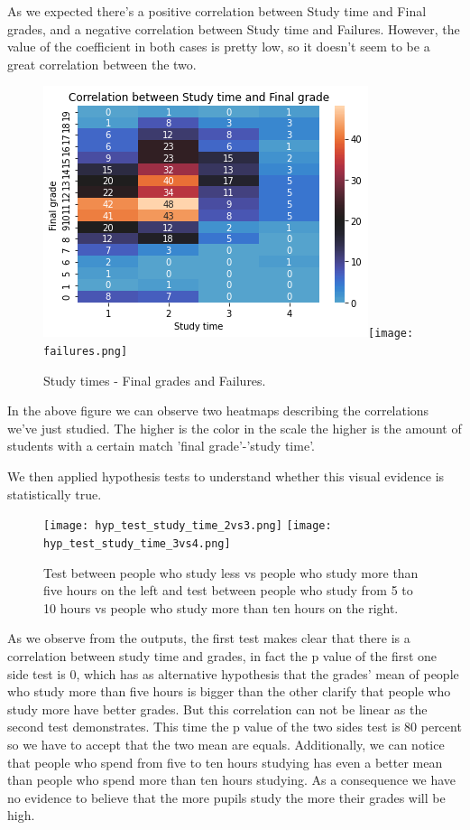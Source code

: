 \documentclass[a4paper, 11pt]{report}
\theoremstyle{definition}
\numberwithin{equation}{section}		%
\numberwithin{table}{section}				%
\begin{document}
\begin{itemize}
As we expected there's a positive correlation between Study time and Final grades, and a negative correlation between Study time and Failures. However, the value of the coefficient in both cases is pretty low, so it doesn't seem to be a great correlation between the two. 

\begin{figure}[h]\centering
\includegraphics[scale=0.5]{g3-st.png}\quad\texttt{[image: failures.png]}
\caption{Study times - Final grades and Failures.}
\end{figure}

In the above figure we can observe two heatmaps describing the correlations we've just studied. The higher is the color in the scale the higher is the amount of students with a certain match 'final grade'-'study time'.

We then applied hypothesis tests to understand whether this visual evidence 
is statistically true.

\begin{figure}[h]\centering
\texttt{[image: hyp\_test\_study\_time\_2vs3.png]}
\texttt{[image: hyp\_test\_study\_time\_3vs4.png]}
\caption{Test between people who study less vs people who study more than five hours on the left and test between people who study from 5 to 10 hours
vs people who study more than ten hours on the right.}
\end{figure}

As we observe from the outputs, the first test makes clear that there is a
correlation between study time and grades, in fact the p value of the first 
one side test is 0, which has as alternative hypothesis that the grades' mean of people who study more than five hours is bigger than the other clarify that people who study more have better grades.  But this correlation can not
be linear as the second test demonstrates. This time the p value of the two
sides test is 80 percent so we have to accept that the two mean are equals. 
Additionally, we can notice that people who spend from five to ten hours 
studying has even a better mean than people who spend more than ten hours 
studying. As a consequence we have no evidence to believe that the more pupils study the more their grades will be high.



\end{itemize}
\end{document}

